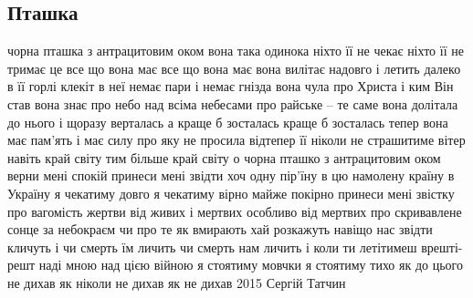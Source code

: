  
 
 
 
 

\subsection{Пташка}
\label{sec:01_04_2021.fb.makarenko_oksana.1.ptashka}

чорна пташка з антрацитовим оком
вона така одинока
ніхто її не чекає ніхто її не тримає
це все що вона має
все що вона має
вона вилітає надовго і летить далеко
в її горлі клекіт
в неї немає пари і немає гнізда
вона чула про Христа
і ким Він став
вона знає про небо над всіма небесами
про райське – те саме
вона долітала до нього і щоразу верталась
а краще б зосталась
краще б зосталась
тепер вона має пам'ять і має силу
про яку не просила
відтепер її ніколи не страшитиме вітер
навіть край світу
тим більше край світу
о чорна пташко з антрацитовим оком
верни мені спокій
принеси мені звідти хоч одну пір'їну
в цю намолену країну
в Україну
я чекатиму довго я чекатиму вірно
майже покірно
принеси мені звістку про вагомість жертви
від живих і мертвих
особливо від мертвих
про скривавлене сонце за небокраєм
чи про те як вмирають
хай розкажуть навіщо нас звідти кличуть
і чи смерть їм личить
чи смерть нам личить
і коли ти летітимеш врешті-решт наді мною
над цією війною
я стоятиму мовчки я стоятиму тихо
як до цього не дихав
як ніколи не дихав
як не дихав
2015
Сергій Татчин
